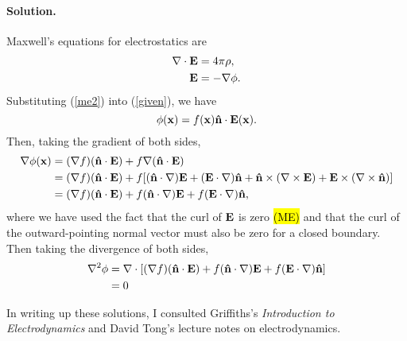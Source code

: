 \documentclass[11pt]{article}
\newcommand{\refeq}[1]{(\ref{#1})}
\newcommand{\beq}{\begin{equation*}}
\newcommand{\eeq}{\end{equation*}}
\newenvironment{solution}
{
    \paragraph{Solution.}
    \ignorespaces
}
{
    \bigskip
}
\begin{document}
\begin{solution}

	Maxwell's equations for electrostatics are
	\begin{align}
		\nabla \cdot \mathbf{E} &= 4\pi\rho, \label{me1} \\
		\mathbf{E} &= -\nabla \phi. \label{me2}
	\end{align}
	Substituting \refeq{me2} into \refeq{given}, we have
	\beq
		\phi(\vx) = f(\vx) \nh \cdot \vE(\vx).
	\eeq
	Then, taking the gradient of both sides,
	\begin{align*}
		\nabla \phi(\mathbf{x}) &= (\nabla f) (\mathbf{\hat{n}} \cdot \mathbf{E}) + f \nabla(\mathbf{\hat{n}} \cdot \mathbf{E}) \\
		&= (\nabla f) (\mathbf{\hat{n}} \cdot \mathbf{E})+ f [(\mathbf{\hat{n}} \cdot \nabla) \mathbf{E} + (\mathbf{E} \cdot \nabla) \mathbf{\hat{n}} + \mathbf{\hat{n}} \times (\nabla \times \mathbf{E}) + \mathbf{E} \times (\nabla \times \mathbf{\hat{n}})] \\
		&= (\nabla f) (\mathbf{\hat{n}} \cdot \mathbf{E})+ f (\mathbf{\hat{n}} \cdot \nabla) \mathbf{E} + f (\mathbf{E} \cdot \nabla) \mathbf{\hat{n}},
	\end{align*}
	where we have used the fact that the curl of $\mathbf{E}$ is zero \hl{(ME)} and that the curl of the outward-pointing normal vector must also be zero for a closed boundary.  Then taking the divergence of both sides,
	\begin{align*}
		\nabla^2 \phi &= \nabla \cdot [(\nabla f) (\mathbf{\hat{n}} \cdot \mathbf{E})+ f (\mathbf{\hat{n}} \cdot \nabla) \mathbf{E} + f (\mathbf{E} \cdot \nabla) \mathbf{\hat{n}}] \\
		&= 0
	\end{align*}
%	
%	
%	
\end{solution}






\vfill
In writing up these solutions, I consulted Griffiths's \emph{Introduction to Electrodynamics} and David Tong's lecture notes on electrodynamics.
\end{document}
